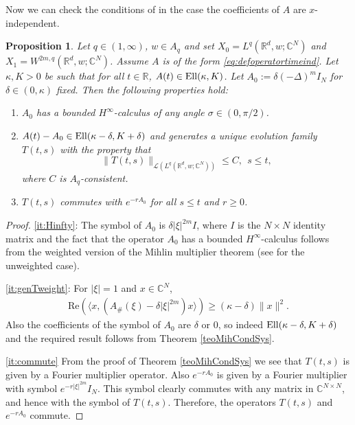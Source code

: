 \documentclass{amsart}
\theoremstyle{plain}
\theoremstyle{remark}
\theoremstyle{plain}
\newtheorem{proposition}[theorem]{Proposition}
\numberwithin{equation}{section}
\begin{document}
Now we can check the conditions of \cite[Theorem 4.9]{GV} in the case the coefficients of $A$ are $x$-independent.
\begin{proposition}\label{prop:evfamSys}
Let $q\in (1, \infty)$, $w\in A_q$ and set $X_0 = L^q({ \mathbb{R} }^d,w;{ \mathbb{C} }^N)$ and $X_1 = W^{2m,q}({ \mathbb{R} }^d,w;{ \mathbb{C} }^N)$.
Assume $A$ is of the form \eqref{eq:defoperatortimeind}. Let $\kappa, K>0$ be such that for all $t\in { \mathbb{R} }$, $A(t) \in{\rm Ell}(\kappa,K)$. Let $A_{0}:=\delta (-\Delta)^{m}I_{N}$ for $\delta\in (0,\kappa)$ fixed. Then the following properties hold:
\begin{enumerate}
\item\label{it:Hinfty} $A_0$ has a bounded $H^\infty$-calculus of any angle $\sigma\in (0,\pi/2)$.
\item\label{it:genTweight} $A(t) - A_0\in {\rm Ell}(\kappa-\delta, K+\delta)$ and generates a unique evolution family $T(t,s)$ with the property that
\[
\|T(t,s)\|_{{{\mathscr L}}(L^{q}({ \mathbb{R} }^{d},w;{ \mathbb{C} }^N))}\leq C, \ \ s\leq t,
\]
where $C$ is $A_q$-consistent.
\item\label{it:commute} $T(t,s)$ commutes with $e^{-rA_0}$ for all $s\leq t$ and $r\geq 0$.
\end{enumerate}
\end{proposition}
\begin{proof}
\eqref{it:Hinfty}: The symbol of $A_0$ is $\delta|\xi|^{2m} I$, where $I$ is the $N\times N$ identity matrix and the fact that the operator $A_0$ has a bounded $H^\infty$-calculus follows from the weighted version of the Mihlin multiplier theorem (see \cite[Example 10.2b]{KW} for the unweighted case).

\eqref{it:genTweight}: For $|\xi|=1$ and $x\in { \mathbb{C} }^N$,
\begin{align*}
\text{Re}({\langle} x, (A_{\#}(\xi) - \delta|\xi|^{2m}) x{\rangle}) \geq(\kappa-\delta) \|x\|^2.
\end{align*}
Also the coefficients of the symbol of $A_0$ are $\delta$ or $0$, so indeed ${\rm Ell}(\kappa-\delta, K+\delta)$ and the required result follows from Theorem \ref{teoMihCondSys}.

\eqref{it:commute} From the proof of Theorem \ref{teoMihCondSys} we see that $T(t,s)$ is given by a Fourier multiplier operator. Also $e^{-rA_0}$ is given by a Fourier multiplier with symbol $e^{-r |\xi|^{2m}}I_N$. This symbol clearly commutes with any matrix in ${ \mathbb{C} }^{N\times N}$, and hence with the symbol of $T(t,s)$. Therefore, the operators $T(t,s)$ and $e^{-rA_0}$ commute.
\end{proof}
\end{document}
